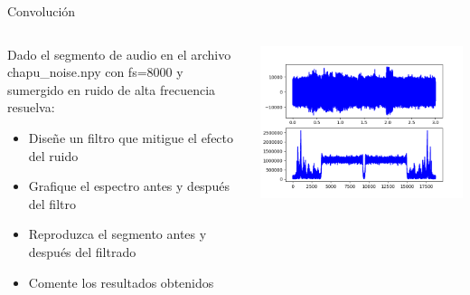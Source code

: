  \begin{frame}{Convolución}
   \begin{columns}[c]
      \hspace{2pt}
      \begin{column}{.6\textwidth}
    Dado el segmento de audio en el archivo chapu\_noise.npy con fs=8000 y sumergido en ruido de alta frecuencia resuelva:
    \begin{itemize}
       \item{Diseñe un filtro que mitigue el efecto del ruido}
       \item{Grafique el espectro antes y después del filtro}
       \item{Reproduzca el segmento antes y después del filtrado}
       \item{Comente los resultados obtenidos}
    \end{itemize}
      \end{column}
      \hspace{2pt}
      \vrule
      \begin{column}{.4\textwidth}
         \centering\includegraphics[width=1.0\textwidth]{tp2/chapu}
      \end{column}
      \hspace{2pt}
   \end{columns}
 \end{frame}


